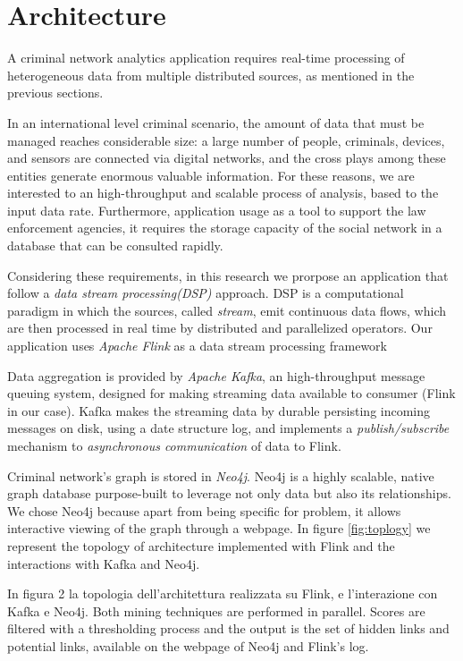 \section{Architecture}
\label{sec:architecture}

A criminal network analytics application requires real-time processing of heterogeneous data from multiple distributed sources, as mentioned in the previous sections.

In an international level criminal scenario, the amount of data that must be managed reaches considerable size: a large number of people, criminals, devices, and sensors are connected via digital networks, and the cross plays among these entities generate enormous valuable information\cite{FrameworkBigdata}. For these reasons, we are interested to an high-throughput and scalable process of analysis, based to the input data rate.
Furthermore, application usage as a tool to support the law enforcement agencies, it requires the storage capacity of the social network in a database that can be consulted rapidly.

Considering these requirements, in this research we prorpose an application that follow a \textit{data stream processing(DSP)} approach. DSP is a computational paradigm in which the sources, called \textit{stream}, emit continuous data flows, which are then processed in real time by distributed and parallelized operators. Our application uses \textit{Apache Flink}\cite{flink} as a data stream processing framework 

Data aggregation is provided by \textit{Apache Kafka}\cite{kafka}, an high-throughput message queuing system, designed for making streaming data available to consumer (Flink in our case). Kafka makes the streaming data by durable persisting incoming messages on disk, using a date structure log, and implements a \textit{publish/subscribe} mechanism to \textit{asynchronous communication} of data to Flink.

Criminal network's graph is stored in \textit{Neo4j}\cite{neo4j}. Neo4j is a highly scalable, native graph database purpose-built to leverage not only data but also its relationships. We chose Neo4j because apart from being specific for problem, it allows interactive viewing of the graph through a webpage.
In figure \ref{fig:toplogy} we represent the topology of architecture implemented with Flink and the interactions with Kafka and Neo4j.

In figura 2 la topologia dell'architettura realizzata su Flink, e l'interazione con Kafka e Neo4j. Both mining techniques are performed in parallel. Scores are filtered with a thresholding process and the output is the set of hidden links and potential links, available on the webpage of Neo4j and Flink's log.
 
